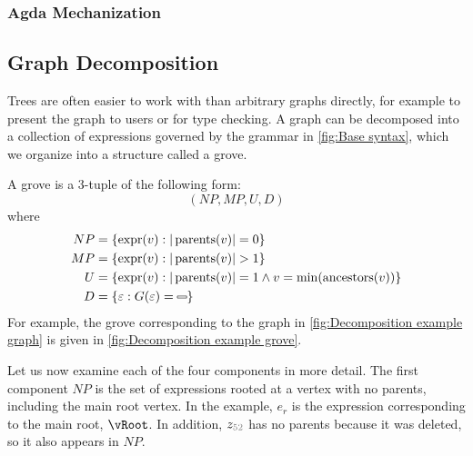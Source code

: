 \subsubsection{Agda Mechanization}%
\label{sub:Agda Mechanization}

\subsection{Graph Decomposition}%
\label{sub:Graph Decomposition}



Trees are often easier to work with than arbitrary graphs directly, for example to present the graph to users or for type checking.
A graph can be decomposed into a collection of expressions governed by the grammar in \autoref{fig:Base syntax}, which we organize into a structure called a grove.

\figureDecompExample


A grove is a 3-tuple of the following form:
\[
  (NP, MP, U, D)
\]
where
\begin{align*}
  NP &= \{\expr(v) : |\parents(v)| = 0\} \\
  MP &= \{\expr(v) : |\parents(v)| > 1\} \\
  U  &= \{\expr(v) : |\parents(v)| = 1 \wedge v = \min(\ancestors(v))\} \\
  D  &= \{\e : G(\e) = \Minus\}
\end{align*}
For example, the grove corresponding to the graph in \autoref{fig:Decomposition example graph} is
given in \autoref{fig:Decomposition example grove}.

Let us now examine each of the four components in more detail.
%
The first component $NP$ is the set of expressions rooted at a vertex with no parents, including the main root vertex.
In the example, $e_r$ is the expression corresponding to the main root, $\vRoot$.
In addition, $z_{\id{52}}$ has no parents because it was deleted, so it also appears in $NP$.

